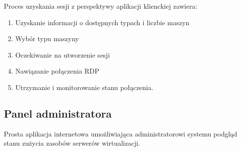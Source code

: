 \documentclass[../deliverable-two.tex]{subfiles}
\begin{document}
Proces uzyskania sesji z perspektywy aplikacji klienckiej zawiera:
\begin{enumerate}
    \item Uzyskanie informacji o dostępnych typach i liczbie maszyn
    \item Wybór typu maszyny
    \item Oczekiwanie na utworzenie sesji
    \item Nawiązanie połączenia RDP
    \item Utrzymanie i monitorowanie stanu połączenia.
\end{enumerate}

\subsection{Panel administratora}

Prosta aplikacja internetowa umożliwiająca administratorowi systemu podgląd stanu zużycia zasobów serwerów wirtualizacji.
\end{document}
